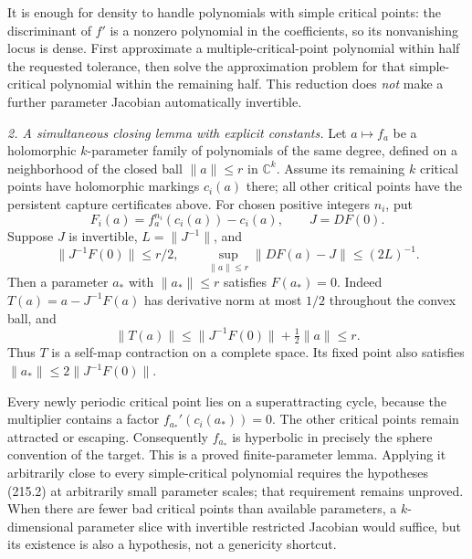 \documentclass[11pt,a4paper]{article}
\newcommand{\C}{\mathbb{C}}
\begin{document}
It is enough for density to handle polynomials with simple critical
points: the discriminant of $f'$ is a nonzero polynomial in the
coefficients, so its nonvanishing locus is dense. First approximate a
multiple-critical-point polynomial within half the requested tolerance,
then solve the approximation problem for that simple-critical polynomial
within the remaining half. This reduction does \emph{not} make a further
parameter Jacobian automatically invertible.

\textit{2. A simultaneous closing lemma with explicit constants.}
Let $a\mapsto f_a$ be a holomorphic $k$-parameter family of polynomials of
the same degree, defined on a neighborhood of the closed ball
$\|a\|\le r$ in $\C^k$. Assume its remaining $k$ critical points have
holomorphic markings $c_i(a)$ there; all other critical points have the
persistent capture certificates above. For chosen positive integers $n_i$,
put
\[
 F_i(a)=f_a^{n_i}(c_i(a))-c_i(a),\qquad J=DF(0).
\]
Suppose $J$ is invertible, $L=\|J^{-1}\|$, and
\[
 \|J^{-1}F(0)\|\le r/2,
 \qquad \sup_{\|a\|\le r}\|DF(a)-J\|\le(2L)^{-1}.          \tag{215.2}
\]
Then a parameter $a_*$ with $\|a_*\|\le r$ satisfies $F(a_*)=0$.
Indeed $T(a)=a-J^{-1}F(a)$ has derivative norm at most $1/2$ throughout
the convex ball, and
\[
 \|T(a)\|\le\|J^{-1}F(0)\|+\tfrac12\|a\|\le r.
\]
Thus $T$ is a self-map contraction on a complete space. Its fixed point
also satisfies $\|a_*\|\le2\|J^{-1}F(0)\|$.

Every newly periodic critical point lies on a superattracting cycle,
because the multiplier contains a factor $f_{a_*}'(c_i(a_*))=0$.
The other critical points remain attracted or escaping. Consequently
$f_{a_*}$ is hyperbolic in precisely the sphere convention of the target.
This is a proved finite-parameter lemma. Applying it arbitrarily close to
every simple-critical polynomial requires the hypotheses (215.2) at
arbitrarily small parameter scales; that requirement remains unproved.
When there are fewer bad critical points than available parameters, a
$k$-dimensional parameter slice with invertible restricted Jacobian would
suffice, but its existence is also a hypothesis, not a genericity shortcut.
\end{document}
